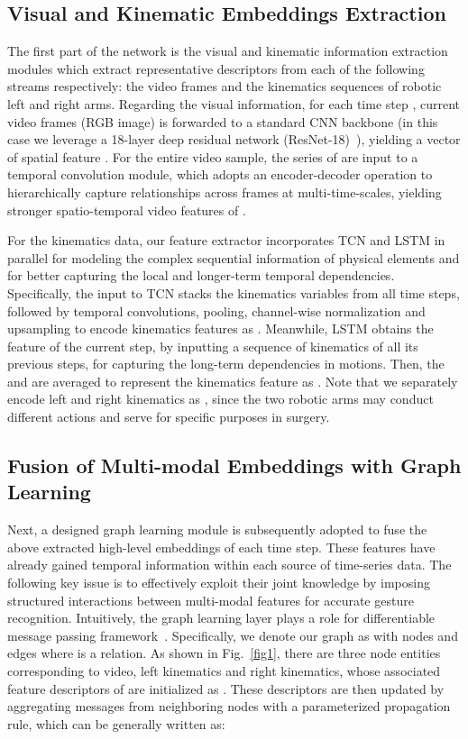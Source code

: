 \documentclass[letterpaper, 10 pt, conference]{ieeeconf}
\begin{document}
\vspace{-1mm}
\subsection{Visual and Kinematic Embeddings Extraction}

The first part of the network is the visual and kinematic information extraction modules which extract representative descriptors from each of the following streams respectively: the video frames and the kinematics sequences of robotic left and right arms.
Regarding the visual information, for each time step , current video frames (RGB image)  is forwarded to a standard CNN backbone (in this case we leverage a 18-layer deep residual network (ResNet-18)~\cite{he2016deep}), yielding a vector of spatial feature . For the entire video sample, the series of  are input to a temporal convolution module, which adopts an encoder-decoder operation to hierarchically capture relationships across frames at multi-time-scales, yielding stronger spatio-temporal video features of .

For the kinematics data, our feature extractor incorporates TCN and LSTM in parallel for modeling the complex sequential information of physical elements and for better capturing the local and longer-term temporal dependencies.
Specifically, the input to TCN stacks the kinematics variables from all time steps, followed by temporal convolutions, pooling, channel-wise normalization and upsampling to encode kinematics features as . Meanwhile, LSTM obtains the feature  of the current step, by inputting a sequence of kinematics of all its previous steps, for capturing the long-term dependencies in motions. Then, the  and  are averaged to represent the kinematics feature as . Note that we separately encode left and right kinematics as , since the two robotic arms may conduct different actions and serve for specific purposes in surgery.

\subsection{Fusion of Multi-modal Embeddings with Graph Learning}

Next, a designed graph learning module is subsequently adopted to fuse the above extracted high-level embeddings  of each time step.
These features have already gained temporal information within each source of time-series data. The following key issue is to effectively exploit their joint knowledge by imposing structured interactions between multi-modal features for accurate gesture recognition.
Intuitively, the graph learning layer plays a role for differentiable message passing framework~\cite{gilmer2017neural}.
Specifically, we denote our graph as  with nodes  and edges   where  is a relation. As shown in Fig.~\ref{fig1}, there are three node entities corresponding to video, left kinematics and right kinematics, whose associated feature descriptors of  are initialized as . These descriptors are then updated by aggregating messages from neighboring nodes with a parameterized propagation rule, which can be generally written as:
\end{document}
